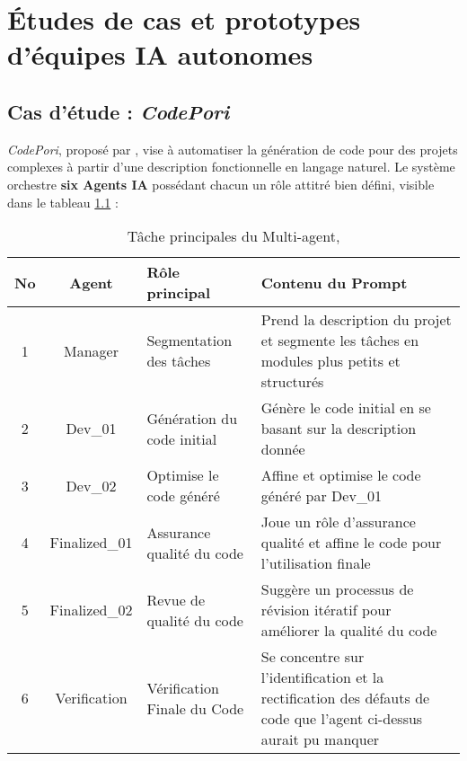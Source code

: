 \chapter{Études de cas et prototypes d’équipes IA autonomes} \label{chapitre:etudeCas}

\section{Cas d’étude : \textit{CodePori}}
\label{etudeCodePori}
\textit{CodePori}, proposé par \textcite{rasheed_codepori_2024}, vise à automatiser la génération de code pour des projets complexes à partir d’une description fonctionnelle en langage naturel.
Le système orchestre \textbf{six Agents IA} possédant chacun un rôle attitré bien défini, visible dans le tableau \ref{tab:mainTasks_MA} :

\begin{table}[H]
    \centering
    \begin{tabular}{|c|c|p{3cm}|p{7cm}|}
        \hline
        \textbf{No} & \textbf{Agent} & \textbf{Rôle principal} & \textbf{Contenu du Prompt} \\
        \hline
         1 & Manager & Segmentation des tâches & Prend la description du projet et segmente les tâches en modules plus petits et structurés \\
         \hline
         2 & Dev\_01 & Génération du code initial & Génère le code initial en se basant sur la description donnée \\
         \hline
         3 & Dev\_02 & Optimise le code généré & Affine et optimise le code généré par Dev\_01 \\
         \hline
         4 & Finalized\_01 & Assurance qualité du code & Joue un rôle d'assurance qualité et affine le code pour l'utilisation finale \\
         \hline
         5 & Finalized\_02 & Revue de qualité du code & Suggère un processus de révision itératif pour améliorer la qualité du code \\
         \hline
         6 & Verification & Vérification Finale du Code & Se concentre sur l'identification et la rectification des défauts de code que l'agent ci-dessus aurait pu manquer \\
         \hline
    \end{tabular}
    \caption{Tâche principales du Multi-agent, \parencite{rasheed_codepori_2024}}
    \label{tab:mainTasks_MA}
\end{table}

